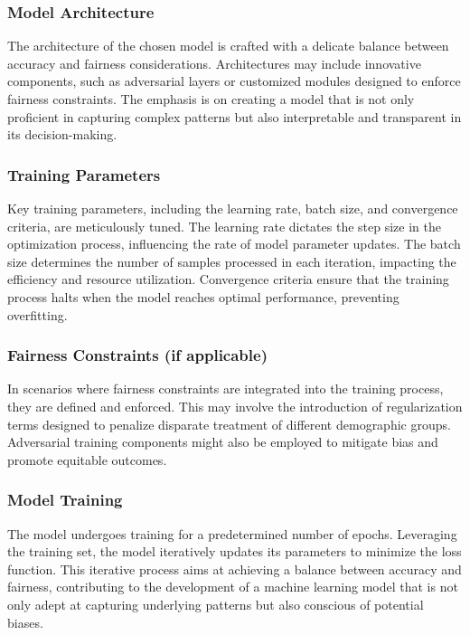 \documentclass[12pt,a4paper,openright,twoside]{book}
\begin{document}
\subsubsection{Model Architecture}

The architecture of the chosen model is crafted with a delicate balance between accuracy and fairness considerations. Architectures may include innovative components, such as adversarial layers or customized modules designed to enforce fairness constraints. The emphasis is on creating a model that is not only proficient in capturing complex patterns but also interpretable and transparent in its decision-making.

\subsubsection{Training Parameters}

Key training parameters, including the learning rate, batch size, and convergence criteria, are meticulously tuned. The learning rate dictates the step size in the optimization process, influencing the rate of model parameter updates. The batch size determines the number of samples processed in each iteration, impacting the efficiency and resource utilization. Convergence criteria ensure that the training process halts when the model reaches optimal performance, preventing overfitting.

\subsubsection{Fairness Constraints (if applicable)}

In scenarios where fairness constraints are integrated into the training process, they are defined and enforced. This may involve the introduction of regularization terms designed to penalize disparate treatment of different demographic groups. Adversarial training components might also be employed to mitigate bias and promote equitable outcomes.

\subsubsection{Model Training}

The model undergoes training for a predetermined number of epochs. Leveraging the training set, the model iteratively updates its parameters to minimize the loss function. This iterative process aims at achieving a balance between accuracy and fairness, contributing to the development of a machine learning model that is not only adept at capturing underlying patterns but also conscious of potential biases.
\end{document}

